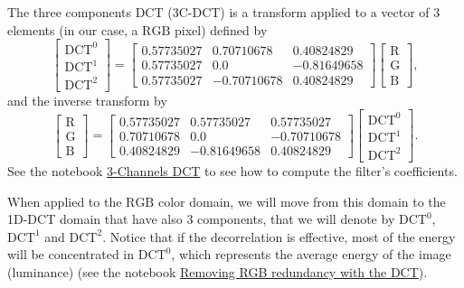 The three components DCT (3C-DCT) is a transform applied to a vector of $3$ elements (in
our case, a $\text{RGB}$ pixel) defined by
\begin{equation}
  \begin{bmatrix}
    \text{DCT}^0 \\
    \text{DCT}^1 \\
    \text{DCT}^2
  \end{bmatrix}
  =
  \begin{bmatrix}
    0.57735027 & 0.70710678 & 0.40824829 \\
    0.57735027 & 0.0 & -0.81649658 \\
    0.57735027 & -0.70710678 & 0.40824829
  \end{bmatrix}
  \begin{bmatrix}
    \text{R} \\
    \text{G} \\
    \text{B}
  \end{bmatrix},
\end{equation}
and the inverse transform by
\begin{equation}
  \begin{bmatrix}
    \text{R} \\
    \text{G} \\
    \text{B}
  \end{bmatrix}
  =
  \begin{bmatrix}
    0.57735027 & 0.57735027 & 0.57735027 \\
    0.70710678 & 0.0 & -0.70710678 \\
    0.40824829 & -0.81649658 & 0.40824829
  \end{bmatrix}
  \begin{bmatrix}
    \text{DCT}^0 \\
    \text{DCT}^1 \\
    \text{DCT}^2
  \end{bmatrix}.
\end{equation}
See the notebook
\href{https://github.com/vicente-gonzalez-ruiz/color_transforms/blob/main/docs/3DCT/notebooks/3DCT_matrix.ipynb}{3-Channels
  DCT} to see how to compute the filter's coefficients.

When applied to the $\text{RGB}$ color domain, we will move from this
domain to the 1D-DCT domain that have also 3 components, that we
will denote by $\text{DCT}^0$, $\text{DCT}^1$ and $\text{DCT}^2$. Notice that if
the decorrelation is effective, most of the energy will be
concentrated in $\text{DCT}^0$, which represents the average energy of
the image (luminance) (see the notebook
\href{https://github.com/vicente-gonzalez-ruiz/color_transforms/blob/main/docs/3DCT/notebooks/3DCT_over_RGB.ipynb}{Removing
  RGB redundancy with the DCT}).

